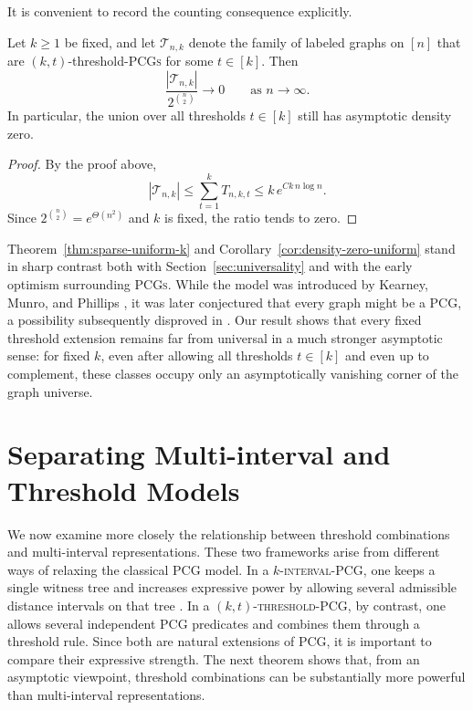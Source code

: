 \documentclass[a4paper,UKenglish,cleveref,autoref,thm-restate]{socg-lipics-v2021}
\begin{document}
It is convenient to record the counting consequence explicitly.

\begin{corollary}\label{cor:density-zero-uniform}
Let $k\ge 1$ be fixed, and let $\mathcal{T}_{n,k}$ denote the family of labeled graphs on $[n]$ that are $(k,t)$-threshold-\textsc{PCGs} for some $t\in[k]$. Then
\[
\frac{|\mathcal{T}_{n,k}|}{2^{\binom{n}{2}}}\to 0
\qquad\text{as } n\to\infty.
\]
In particular, the union over all thresholds $t\in[k]$ still has asymptotic density zero.
\end{corollary}

\begin{proof}
By the proof above,
\[
|\mathcal{T}_{n,k}|
\le \sum_{t=1}^k T_{n,k,t}
\le k\,e^{Ck\,n\log n}.
\]
Since $2^{\binom{n}{2}}=e^{\Theta(n^2)}$ and $k$ is fixed, the ratio tends to zero.
\end{proof}

Theorem~\ref{thm:sparse-uniform-k} and Corollary~\ref{cor:density-zero-uniform}
stand in sharp contrast both with Section~\ref{sec:universality} and with the early
optimism surrounding \textsc{PCGs}. While the model was introduced by Kearney, Munro,
and Phillips \cite{Kearney2003EfficientGOU}, it was later conjectured that every graph
might be a \textsc{PCG}, a possibility subsequently disproved in
\cite{Yanhaona2010DiscoveringPCV}. Our result shows that every fixed threshold extension remains
far from universal in a much stronger asymptotic sense: for fixed $k$, even after allowing
all thresholds $t\in[k]$ and even up to complement, these classes occupy only an
asymptotically vanishing corner of the graph universe.

\section{Separating Multi-interval and Threshold Models}\label{sec:consequences}

We now examine more closely the relationship between threshold combinations and
multi-interval representations. These two frameworks arise from different ways of
relaxing the classical \textsc{PCG} model. In a \textsc{$k$-interval-\textsc{PCG}},
one keeps a single witness tree and increases expressive power by allowing several
admissible distance intervals on that tree \cite{Ahmed2017MultiintervalPCAP}. In a
\textsc{$(k,t)$-threshold-\textsc{PCG}}, by contrast, one allows several independent
\textsc{PCG} predicates and combines them through a threshold rule. Since both are natural extensions of \textsc{PCG}, it is
important to compare their expressive strength. The next theorem shows that, from an
asymptotic viewpoint, threshold combinations can be substantially more powerful than
multi-interval representations.
\end{document}

